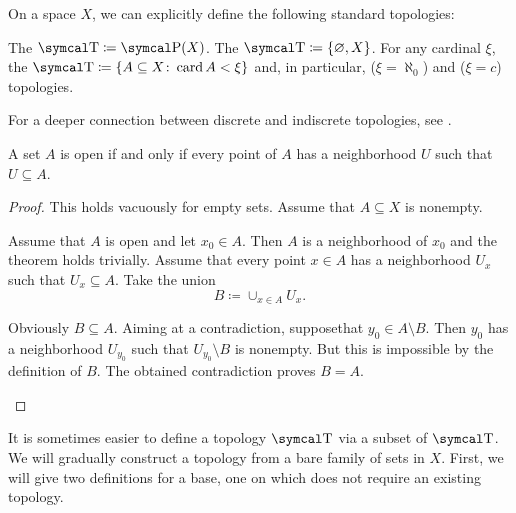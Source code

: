 \begin{definition}\label{def:standard_topologies}
  On a space \( X \), we can explicitly define the following standard topologies:
  \begin{defenum}
     The  \( \CT \coloneqq \Power(X) \).
     The  \( \CT \coloneqq \{ \varnothing, X \} \).
     For any cardinal \( \xi \), the  \( \CT \coloneqq \{ A \subseteq X \colon \Card A < \xi \} \) and, in particular,  (\( \xi = \aleph_0 \)) and  (\( \xi = c \)) topologies.
  \end{defenum}

  For a deeper connection between discrete and indiscrete topologies, see .
\end{definition}

\begin{proposition}\label{thm:set_open_iff_neighborhood_is_contained}
  A set \( A \) is open if and only if every point of \( A \) has a neighborhood \( U \) such that \( U \subseteq A \).
\end{proposition}
\begin{proof}
  This holds vacuously for empty sets. Assume that \( A \subseteq X \) is nonempty.

  \begin{description}
    \Implies Assume that \( A \) is open and let \( x_0 \in A \). Then \( A \) is a neighborhood of \( x_0 \) and the theorem holds trivially.
    \ImpliedBy Assume that every point \( x \in A \) has a neighborhood \( U_x \) such that \( U_x \subseteq A \). Take the union
    \begin{equation*}
      B \coloneqq \cup_{x \in A} U_x.
    \end{equation*}

    Obviously \( B \subseteq A \). Aiming at a contradiction, suppose\LEM that \( y_0 \in A \setminus B \). Then \( y_0 \) has a neighborhood \( U_{y_0} \) such that \( U_{y_0} \setminus B \) is nonempty. But this is impossible by the definition of \( B \). The obtained contradiction proves \( B = A \).
  \end{description}
\end{proof}

\begin{remark}\label{remark:abritrary_family_to_topology}
  It is sometimes easier to define a topology \( \CT \) via a subset of \( \CT \). We will gradually construct a topology from a bare family of sets in \( X \). First, we will give two definitions for a base, one on which does not require an existing topology.
\end{remark}

